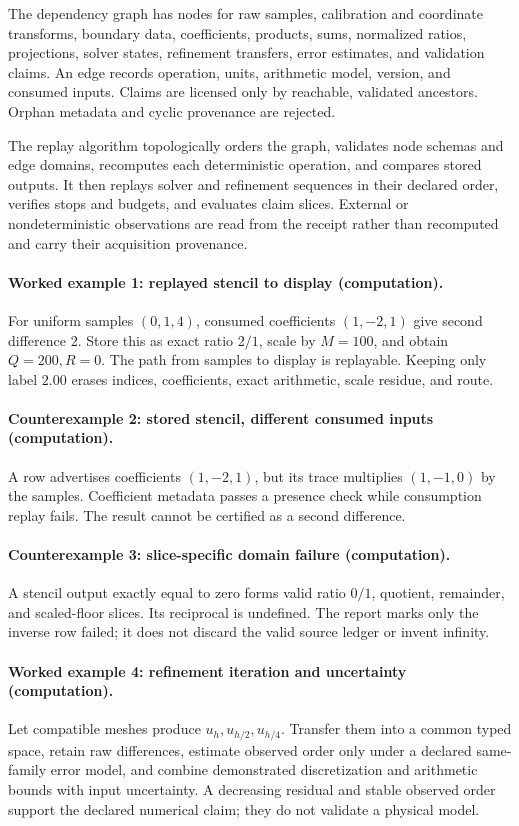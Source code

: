 The dependency graph has nodes for raw samples, calibration and coordinate transforms, boundary data, coefficients,
products, sums, normalized ratios, projections, solver states, refinement transfers, error estimates, and validation
claims.  An edge records operation, units, arithmetic model, version, and consumed inputs.  Claims are licensed only
by reachable, validated ancestors.  Orphan metadata and cyclic provenance are rejected.

The replay algorithm topologically orders the graph, validates node schemas and edge domains, recomputes each
deterministic operation, and compares stored outputs.  It then replays solver and refinement sequences in their
declared order, verifies stops and budgets, and evaluates claim slices.  External or nondeterministic observations are
read from the receipt rather than recomputed and carry their acquisition provenance.

\paragraph{Worked example 1: replayed stencil to display (computation).}
For uniform samples \((0,1,4)\), consumed coefficients \((1,-2,1)\) give second difference \(2\).  Store this as
exact ratio \(2/1\), scale by \(M=100\), and obtain \(Q=200,R=0\).  The path from samples to display is replayable.
Keeping only label \(2.00\) erases indices, coefficients, exact arithmetic, scale residue, and route.

\paragraph{Counterexample 2: stored stencil, different consumed inputs (computation).}
A row advertises coefficients \((1,-2,1)\), but its trace multiplies \((1,-1,0)\) by the samples.  Coefficient
metadata passes a presence check while consumption replay fails.  The result cannot be certified as a second
difference.

\paragraph{Counterexample 3: slice-specific domain failure (computation).}
A stencil output exactly equal to zero forms valid ratio \(0/1\), quotient, remainder, and scaled-floor slices.
Its reciprocal is undefined.  The report marks only the inverse row failed; it does not discard the valid source
ledger or invent infinity.

\paragraph{Worked example 4: refinement iteration and uncertainty (computation).}
Let compatible meshes produce \(u_h,u_{h/2},u_{h/4}\).  Transfer them into a common typed space, retain raw
differences, estimate observed order only under a declared same-family error model, and combine demonstrated
discretization and arithmetic bounds with input uncertainty.  A decreasing residual and stable observed order support
the declared numerical claim; they do not validate a physical model.

